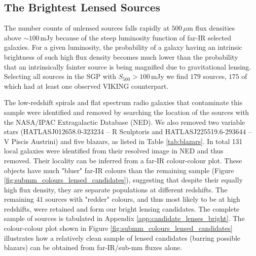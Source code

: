 \subsection{The Brightest Lensed Sources}
\label{sec:brightest_lenses}

The number counts of unlensed sources falls rapidly at $500\,\mu$m flux densities above $\sim 100\,$mJy because of the steep luminosity function of far-IR selected galaxies. For a given luminosity, the probability of a galaxy having an intrinsic brightness of such high flux density becomes much lower than the probability that an intrinsically fainter source is being magnified due to gravitational lensing. Selecting all sources in the SGP with $S_{500} > 100\,$mJy we find $179$ sources, $175$ of which had at least one observed VIKING counterpart. 

The low-redshift spirals and flat spectrum radio galaxies that contaminate this sample were identified and removed by searching the location of the sources with the NASA/IPAC Extragalactic Database (NED). We also removed two variable stars (HATLASJ012658.0-323234 -- R Sculptoris and HATLASJ225519.6-293644 -- V Piscis Austrini) and five blazars, as listed in Table \ref{tab:blazars}. In total 131 local galaxies were identified from their resolved image in NED and thus removed. Their locality can be inferred from a far-IR colour-colour plot. These objects have much "bluer" far-IR colours than the remaining sample (Figure \ref{fig:submm_colours_lensed_candidates}), suggesting that despite their equally high flux density, they are separate populations at different redshifts. The remaining $41$ sources with "redder" colours, and thus most likely to be at high redshifts, were retained and form our bright lensing candidates. The complete sample of sources is tabulated in Appendix \ref{app:candidate_lenses_bright}. The colour-colour plot shown in Figure \ref{fig:submm_colours_lensed_candidates} illustrates how a relatively clean sample of lensed candidates (barring possible blazars) can be obtained from far-IR/sub-mm fluxes alone.

